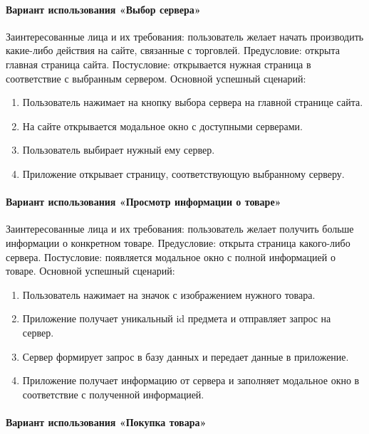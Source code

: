 \paragraph{Вариант использования «Выбор сервера»}

Заинтересованные лица и их требования: пользователь желает начать производить какие-либо действия на сайте, связанные с торговлей. Предусловие: открыта главная страница сайта. Постусловие: открывается нужная страница в соответствие с выбранным сервером. Основной успешный сценарий:

\begin{enumerate}
	\item Пользователь нажимает на кнопку выбора сервера на главной странице сайта.
	\item На сайте открывается модальное окно с доступными серверами.
	\item Пользователь выбирает нужный ему сервер.
	\item Приложение открывает страницу, соответствующую выбранному серверу.
\end{enumerate}

\paragraph{Вариант использования «Просмотр информации о товаре»}

Заинтересованные лица и их требования: пользователь желает получить больше информации о конкретном товаре. Предусловие: открыта страница какого-либо сервера. Постусловие: появляется модальное окно с полной информацией о товаре. Основной успешный сценарий:

\begin{enumerate}
	\item Пользователь нажимает на значок с изображением нужного товара.
	\item Приложение получает уникальный id предмета и отправляет запрос на сервер.
	\item Сервер формирует запрос в базу данных и передает данные в приложение.
	\item Приложение получает информацию от сервера и заполняет модальное окно в соответствие с полученной информацией.
\end{enumerate}

\paragraph{Вариант использования «Покупка товара»}

